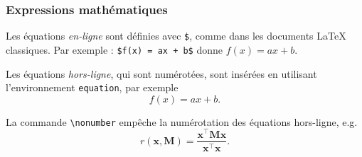 \documentclass[10pt,    %
    french,             %
    xcolor=table,       %
    envcountsect,       %
    aspectratio=43      %
]{beamer}
\begin{document}
\begin{frame}
    \frametitle{Expressions mathématiques}
    
    Les équations \textit{en-ligne} sont définies avec \texttt{\$}, comme dans les documents \LaTeX{} classiques. Par exemple : \texttt{\$f(x) = ax + b\$} donne $f(x)=ax + b$.
    
    \vspace{0.25cm}
    Les équations \textit{hors-ligne}, qui sont numérotées, sont insérées en utilisant l'environnement \texttt{equation}, par exemple
    \begin{equation}
        \label{equ:affine}
        f(x) = ax + b.
    \end{equation}
    
    La commande \texttt{\textbackslash{}nonumber} empêche la numérotation des équations hors-ligne, e.g.
    \begin{equation}
        \label{equ:rayleigh}
        r(\mathbf{x},\mathbf{M}) = \frac{\mathbf{x}^\top \mathbf{M} \mathbf{x}}{\mathbf{x}^\top \mathbf{x}}. \nonumber
    \end{equation}
    
    
    
    
    
    
\end{frame}




\end{document}
